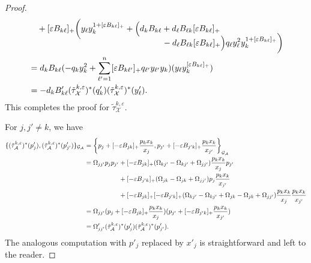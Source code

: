\documentclass{amsart}
\numberwithin{equation}{section}
\newcommand{\cA}{\mathcal{A}}
\newcommand{\cG}{\mathcal{G}}
\newcommand{\cX}{\mathcal{X}}
\begin{document}
\begin{proof}
\begin{align*}
    &\quad + [\varepsilon B_{k\ell}]_+ \bigg(y_\ell y_k^{1+[\varepsilon B_{k\ell}]_+} + \Big( d_k B_{k\ell} + d_\ell B_{\ell k} [\varepsilon B_{k\ell}]_+\\[-11pt]
    &\hspace{2.20in}- d_\ell B_{\ell k} [\varepsilon B_{k\ell}]_+\Big) q_\ell y_\ell^2 y_k^{1+[\varepsilon B_{k\ell}]_+}\bigg)\\
    &=d_k B_{k\ell} (-q_k y_k^2 + \sum\limits_{\ell'=1}^n[\varepsilon B_{k\ell'}]_+ q_{\ell'} y_{\ell'} y_k) (y_\ell y_k^{[\varepsilon B_{k\ell}]_+})\\
    &=-d_k B'_{k\ell}(\tilde\tau_\cX^{k,\varepsilon})^*(q'_k) (\tilde\tau_\cX^{k,\varepsilon})^*(y'_\ell).
  \end{align*}
  This completes the proof for $\tilde\tau_\cX^{k,\varepsilon}$.

  For $j,j'\ne k$, we have
  \begin{align*}
    \{(\tilde\tau_\cA^{k,\varepsilon})^*(p'_j),(\tilde\tau_\cA^{k,\varepsilon})^*(p'_{j'})\}_{\cG_\cA}
    &=\left\{p_j+[-\varepsilon B_{jk}]_+\frac{p_k x_k}{x_j},p_{j'}+[-\varepsilon B_{j'k}]_+\frac{p_k x_k}{x_{j'}}\right\}_{\cG_\cA}\\
    &=\Omega_{jj'} p_j p_{j'} + [-\varepsilon B_{jk}]_+ (\Omega_{kj'} - \Omega_{kj'} + \Omega_{jj'}) \frac{p_k x_k}{x_j} p_{j'}\\
    &\hspace{0.725in} + [-\varepsilon B_{j'k}]_+ (\Omega_{jk} - \Omega_{jk} + \Omega_{jj'}) p_j \frac{p_k x_k}{x_{j'}}\\
    &\hspace{0.725in} + [-\varepsilon B_{jk}]_+ [-\varepsilon B_{j'k}]_+ (\Omega_{kj'} - \Omega_{kj'} + \Omega_{jk} - \Omega_{jk} + \Omega_{jj'}) \frac{p_k x_k}{x_j} \frac{p_k x_k}{x_{j'}}\\
    &=\Omega_{jj'} (p_j+[-\varepsilon B_{jk}]_+\frac{p_k x_k}{x_j}) (p_{j'}+[-\varepsilon B_{j'k}]_+\frac{p_k x_k}{x_{j'}})\\
    &=\Omega'_{jj'} (\tilde\tau_\cA^{k,\varepsilon})^*(p'_j) (\tilde\tau_\cA^{k,\varepsilon})^*(p'_{j'}).
  \end{align*}
  The analogous computation with $p'_j$ replaced by $x'_j$ is straightforward and left to the reader.


\end{proof}
\end{document}
